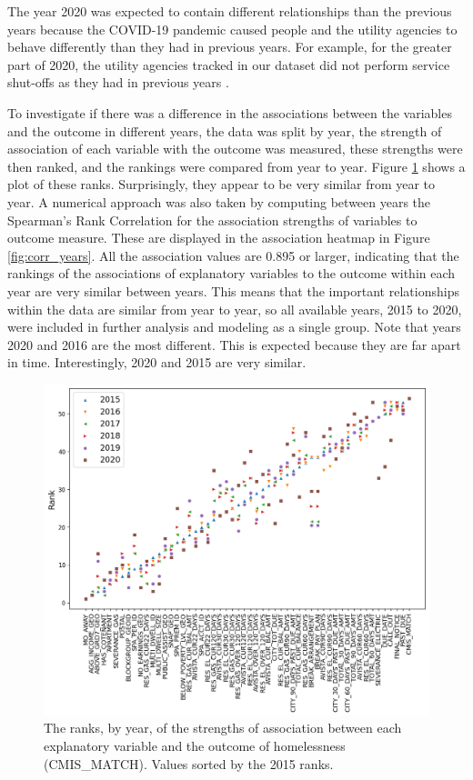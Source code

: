 \documentclass[12pt]{report}
\begin{document}
The year 2020 was expected to contain different relationships than the previous years because the COVID-19 pandemic caused people and the utility agencies to behave differently than they had in previous years. For example, for the greater part of 2020, the utility agencies tracked in our dataset did not perform service shut-offs as they had in previous years \cite{white2020utilities}. 

To investigate if there was a difference in the associations between the variables and the outcome in different years, the data was split by year, the strength of association of each variable with the outcome was measured, these strengths were then ranked, and the rankings were compared from year to year. Figure \ref{fig:corrRankByYear} shows a plot of these ranks. Surprisingly, they appear to be very similar from year to year. A numerical approach was also taken by computing between years the Spearman's Rank Correlation for the association strengths of variables to outcome measure. These are displayed in the association heatmap in Figure \ref{fig:corr_years}. All the association values are 0.895 or larger, indicating that the rankings of the associations of explanatory variables to the outcome within each year are very similar between years. This means that the important relationships within the data are similar from year to year, so all available years, 2015 to 2020, were included in further analysis and modeling as a single group. Note that years 2020 and 2016 are the most different. This is expected because they are far apart in time. Interestingly, 2020 and 2015 are very similar.

\begin{figure}[h]
    \centering
    \includegraphics[width=\textwidth]{../img/corrRankByYear.png}
    \caption[Ranks of variable correlation by year]{The ranks, by year, of the strengths of association between each explanatory variable and the outcome of homelessness (CMIS\_MATCH). Values sorted by the 2015 ranks.}
    \label{fig:corrRankByYear}
\end{figure}
\end{document}
